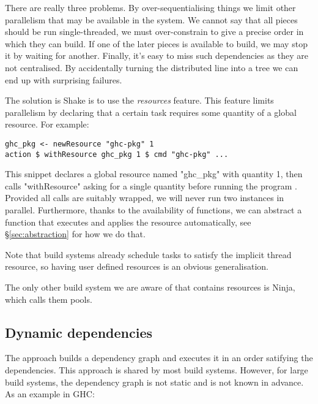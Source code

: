 There are really three problems. By over-sequentialising things we limit other parallelism that may be available in the system. We cannot say that all pieces should be run single-threaded, we must over-constrain to give a precise order in which they can build. If one of the later pieces is available to build, we may stop it by waiting for another. Finally, it's easy to miss such dependencies as they are not centralised. By accidentally turning the distributed line into a tree we can end up with surprising failures.

The solution is Shake is to use the \emph{resources} feature. This feature limits parallelism by declaring that a certain task requires some quantity of a global resource. For example:

\begin{verbatim}
ghc_pkg <- newResource "ghc-pkg" 1
action $ withResource ghc_pkg 1 $ cmd "ghc-pkg" ...
\end{verbatim}

This snippet declares a global resource named \lst"ghc_pkg" with quantity 1, then calls \lst"withResource" asking for a single quantity before running the program . Provided all  calls are suitably wrapped, we will never run two instances in parallel. Furthermore, thanks to the availability of functions, we can abstract a function that executes  and applies the resource automatically, see \S\ref{sec:abstraction} for how we do that.

Note that build systems already schedule tasks to satisfy the implicit thread resource, so having user defined resources is an obvious generalisation.

The only other build system we are aware of that contains resources is Ninja, which calls them pools.

\subsection{Dynamic dependencies}

The \make{} approach builds a dependency graph and executes it in an order satifying the dependencies. This approach is shared by most build systems. However, for large build systems, the dependency graph is not static and is not known in advance. As an example in GHC:


